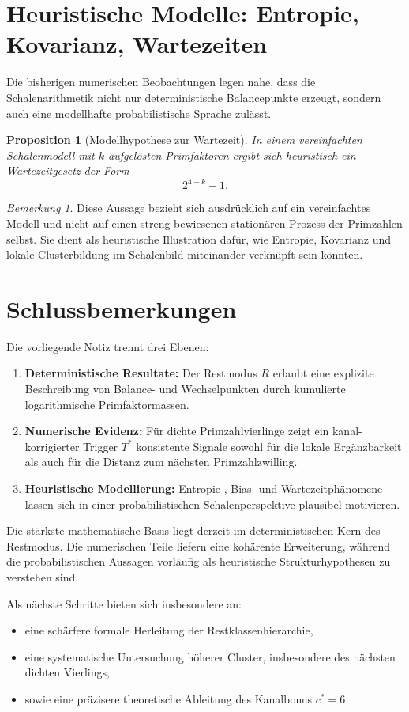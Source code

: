 \documentclass[11pt,a4paper]{article}
\theoremstyle{plain}
\newtheorem{proposition}[satz]{Proposition}
\theoremstyle{definition}
\theoremstyle{remark}
\newtheorem{bemerkung}[satz]{Bemerkung}
\newcommand{\1}{\mathbf{1}}
\begin{document}
	\section{Heuristische Modelle: Entropie, Kovarianz, Wartezeiten}
	\label{sec:modelle}
	
	Die bisherigen numerischen Beobachtungen legen nahe, dass die Schalenarithmetik nicht nur deterministische Balancepunkte erzeugt, sondern auch eine modellhafte probabilistische Sprache zulässt.
	
	\begin{proposition}[Modellhypothese zur Wartezeit]
		\label{prop:wartezeit}
		In einem vereinfachten Schalenmodell mit \(k\) aufgelösten Primfaktoren ergibt sich heuristisch ein Wartezeitgesetz der Form
		\[
		2^{4-k}-1.
		\]
	\end{proposition}
	
	\begin{bemerkung}
		Diese Aussage bezieht sich ausdrücklich auf ein vereinfachtes Modell und nicht auf einen streng bewiesenen stationären Prozess der Primzahlen selbst. Sie dient als heuristische Illustration dafür, wie Entropie, Kovarianz und lokale Clusterbildung im Schalenbild miteinander verknüpft sein könnten.
	\end{bemerkung}
	
	\section{Schlussbemerkungen}
	\label{sec:schluss}
	
	Die vorliegende Notiz trennt drei Ebenen:
	\begin{enumerate}[label=(\arabic*)]
		\item \textbf{Deterministische Resultate:} Der Restmodus \(R\) erlaubt eine explizite Beschreibung von Balance- und Wechselpunkten durch kumulierte logarithmische Primfaktormassen.
		\item \textbf{Numerische Evidenz:} Für dichte Primzahlvierlinge zeigt ein kanal-korrigierter Trigger \(T^*\) konsistente Signale sowohl für die lokale Ergänzbarkeit als auch für die Distanz zum nächsten Primzahlzwilling.
		\item \textbf{Heuristische Modellierung:} Entropie-, Bias- und Wartezeitphänomene lassen sich in einer probabilistischen Schalenperspektive plausibel motivieren.
	\end{enumerate}
	
	Die stärkste mathematische Basis liegt derzeit im deterministischen Kern des Restmodus. Die numerischen Teile liefern eine kohärente Erweiterung, während die probabilistischen Aussagen vorläufig als heuristische Strukturhypothesen zu verstehen sind.
	
	\medskip
	
	Als nächste Schritte bieten sich insbesondere an:
	\begin{itemize}
		\item eine schärfere formale Herleitung der Restklassenhierarchie,
		\item eine systematische Untersuchung höherer Cluster, insbesondere des nächsten dichten Vierlings,
		\item sowie eine präzisere theoretische Ableitung des Kanalbonus \(c^*=6\).
	\end{itemize}
	
\end{document}
